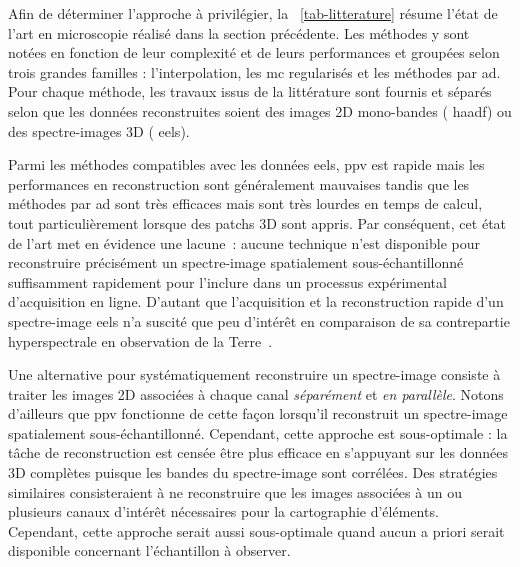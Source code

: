 Afin de déterminer l'approche à privilégier, la \tabname~\ref{tab-litterature} résume l'état de l'art en microscopie réalisé dans la section précédente. Les méthodes y sont notées en fonction de leur complexité et de leurs performances et groupées selon trois grandes familles : l'interpolation, les \gls{mc} regularisés et les méthodes par \gls{ad}. Pour chaque méthode, les travaux issus de la littérature sont fournis et séparés selon que les données reconstruites soient des images 2D mono-bandes (\eg{} \gls{haadf}) ou des spectre-images 3D (\eg{} \gls{eels}).

Parmi les méthodes compatibles avec les données \gls{eels}, \gls{ppv} est rapide mais les performances en reconstruction sont généralement mauvaises tandis que les méthodes par \gls{ad} sont très efficaces mais sont très lourdes en temps de calcul, tout particulièrement lorsque des patchs 3D sont appris. Par conséquent, cet état de l'art met en évidence une lacune : aucune technique n'est disponible pour reconstruire précisément un spectre-image spatialement sous-échantillonné suffisamment rapidement pour l'inclure dans un processus expérimental d'acquisition en ligne. D'autant que l'acquisition et la reconstruction rapide d'un spectre-image \gls{eels} n'a suscité que peu d'intérêt en comparaison de sa contrepartie hyperspectrale en observation de la Terre~\cite{zhang_hyperspectral_2014, chayes_pre_processing_2017, golbabaee_hyperspectral_2012, chen_inpainting_2012}.

Une alternative pour systématiquement reconstruire un spectre-image consiste à traiter les images 2D associées à chaque canal \emph{séparément} et \emph{en parallèle}. Notons d'ailleurs que \gls{ppv} fonctionne de cette façon lorsqu'il reconstruit un spectre-image spatialement sous-échantillonné. Cependant, cette approche est sous-optimale : la tâche de reconstruction est censée être plus efficace en s'appuyant sur les données 3D complètes puisque les bandes du spectre-image sont corrélées. Des stratégies similaires consisteraient à ne reconstruire que les images associées à un ou plusieurs canaux d'intérêt nécessaires pour la cartographie d'éléments. Cependant, cette approche serait aussi sous-optimale quand aucun a priori serait disponible concernant l'échantillon à observer.

